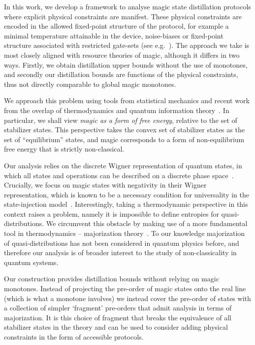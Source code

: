 \documentclass[pra,
aps,
twocolumn,
superscriptaddress,
groupedaddress,
nofootinbib,
reprint
]{revtex4-1}
\begin{document}
In this work, we develop a framework to analyse magic state distillation protocols where explicit physical constraints are manifest. These physical constraints are encoded in the allowed fixed-point structure of the protocol, for example a minimal temperature attainable in the device, noise-biases or fixed-point structure associated with restricted gate-sets (see e.g.~\cite{Aliferis_2008, Stephens_2013, Li_2015, Babbush_2018, Tuckett_2019, Guillaud_2019, Fowler_2019}). The approach we take is most closely aligned with resource theories of magic, although it differs in two ways. Firstly, we obtain distillation upper bounds without the use of monotones, and secondly our distillation bounds are functions of the physical constraints, thus not directly comparable to global magic monotones.

We approach this problem using tools from statistical mechanics and recent work from the overlap of thermodynamics and quantum information theory~\cite{cit:gour, cit:gour2}. In particular, we shall view \emph{magic as a form of free energy}, relative to the set of stabilizer states. This perspective takes the convex set of stabilizer states as the set of ``equilibrium'' states, and magic corresponds to a form of non-equilibrium free energy that is strictly non-classical.

Our analysis relies on the discrete Wigner representation of quantum states, in which all states and operations can be described on a discrete phase space~\cite{Ferrie_2008, Okay_2021}. Crucially, we focus on magic states with negativity in their Wigner representation, which is known to be a necessary condition for universality in the state-injection model~\cite{cit:veitch, cit:mari, cit:gottesman, cit:knill, Campbell_2011}. Interestingly, taking a thermodynamic perspective in this context raises a problem, namely it is impossible to define entropies for quasi-distributions. We circumvent this obstacle by making use of a more fundamental tool in thermodynamics -- majorization theory~\cite{cit:marshall, Veinott_1971, Ruch_1976}. To our knowledge majorization of quasi-distributions has not been considered in quantum physics before, and therefore our analysis is of broader interest to the study of non-classicality in quantum systems.

Our construction provides distillation bounds without relying on magic monotones. Instead of projecting the pre-order of magic states onto the real line (which is what a monotone involves) we instead cover the pre-order of states with a collection of simpler `fragment' pre-orders that admit analysis in terms of majorization. It is this choice of fragment that breaks the equivalence of all stabilizer states in the theory and can be used to consider adding physical constraints in the form of accessible protocols.
\end{document}
